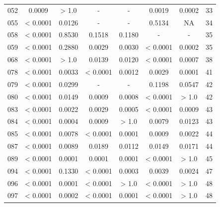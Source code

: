 {\begin{longtable}{cccccccc}
052 & {\color{red}0.0009} & > 1.0 & - & - & {\color{red}0.0019} & {\color{red}0.0002} & 33 \\
055 & {\color{red} < 0.0001} & {\color{red}0.0126} & - & - & 0.5134 & NA & 34 \\
058 & {\color{red} < 0.0001} & 0.8530 & 0.1518 & 0.1180 & - & - & 35 \\
059 & {\color{red} < 0.0001} & 0.2880 & {\color{red}0.0029} & {\color{red}0.0030} & {\color{red} < 0.0001} & {\color{red}0.0002} & 35 \\
068 & {\color{red} < 0.0001} & > 1.0 & {\color{red}0.0139} & {\color{red}0.0120} & {\color{red} < 0.0001} & {\color{red}0.0007} & 38 \\
078 & {\color{red} < 0.0001} & {\color{red}0.0033} & {\color{red} < 0.0001} & {\color{red}0.0012} & {\color{red}0.0029} & {\color{red}0.0001} & 41 \\
079 & {\color{red} < 0.0001} & {\color{red}0.0299} & - & - & 0.1198 & 0.0547 & 42 \\
080 & {\color{red} < 0.0001} & {\color{red}0.0149} & {\color{red}0.0009} & {\color{red}0.0008} & {\color{red} < 0.0001} & > 1.0 & 42 \\
083 & {\color{red} < 0.0001} & {\color{red}0.0022} & {\color{red}0.0029} & {\color{red}0.0005} & {\color{red} < 0.0001} & {\color{red}0.0009} & 43 \\
084 & {\color{red} < 0.0001} & {\color{red}0.0004} & {\color{red}0.0009} & > 1.0 & {\color{red}0.0079} & {\color{red}0.0123} & 43 \\
085 & {\color{red} < 0.0001} & {\color{red}0.0078} & {\color{red} < 0.0001} & {\color{red}0.0001} & {\color{red}0.0009} & {\color{red}0.0022} & 44 \\
087 & {\color{red} < 0.0001} & {\color{red}0.0089} & {\color{red}0.0189} & {\color{red}0.0112} & {\color{red}0.0149} & {\color{red}0.0171} & 44 \\
089 & {\color{red} < 0.0001} & {\color{red}0.0001} & {\color{red}0.0001} & {\color{red}0.0001} & {\color{red} < 0.0001} & > 1.0 & 45 \\
094 & {\color{red} < 0.0001} & {\color{red}0.1330} & {\color{red} < 0.0001} & {\color{red}0.0003} & {\color{red}0.0039} & {\color{red}0.0024} & 47 \\
096 & {\color{red} < 0.0001} & {\color{red}0.0001} & {\color{red} < 0.0001} & > 1.0 & {\color{red} < 0.0001} & > 1.0 & 48 \\
097 & {\color{red} < 0.0001} & {\color{red}0.0002} & {\color{red} < 0.0001} & {\color{red}0.0001} & {\color{red} < 0.0001} & > 1.0 & 48 \\

\end{longtable}}
